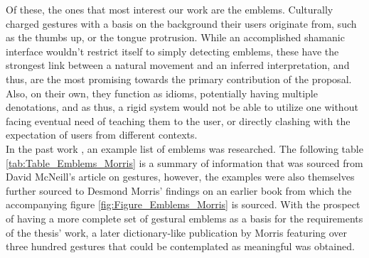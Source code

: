     Of these, the ones that most interest our work are the emblems. Culturally charged gestures with a basis on the background their users originate from, such as the thumbs up, or the tongue protrusion. While an accomplished shamanic interface wouldn’t restrict itself to simply detecting emblems, these have the strongest link between a natural movement and an inferred interpretation, and thus, are the most promising towards the primary contribution of the proposal. Also, on their own, they function as idioms, potentially having multiple denotations, and as thus, a rigid system would not be able to utilize one without facing eventual need of teaching them to the user, or directly clashing with the expectation of users from different contexts.\\
    In the past work \cite{pinto2015}, an example list of emblems was researched. The following table \ref{tab:Table_Emblems_Morris} is a summary of information that was sourced from David McNeill’s article\cite{mcneill1994} on gestures, however, the examples were also themselves further sourced to Desmond Morris’ findings on an earlier book\cite{morris1979} from which the accompanying figure \ref{fig:Figure_Emblems_Morris} is sourced. With the prospect of having a more complete set of gestural emblems as a basis for the requirements of the thesis’ work, a later dictionary-like publication by Morris featuring over three hundred gestures that could be contemplated as meaningful was obtained.


